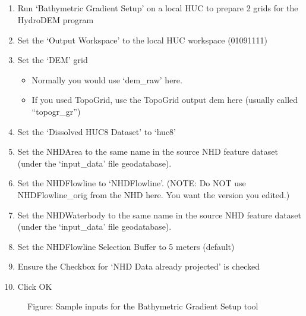 \documentclass[letterpaper,10pt,english]{sphinxmanual}
\begin{document}
\subparagraph{}
\label{\detokenize{ex_1:a-bathymetric-gradient-setup-from-arccat}}\begin{enumerate}
\def\theenumi{\arabic{enumi}}
\def\labelenumi{\theenumi .}
\makeatletter\def\p@enumii{\p@enumi \theenumi .}\makeatother
\item {} 
Run ‘Bathymetric Gradient Setup’ on a local HUC to prepare 2 grids for the HydroDEM program

\item {} 
Set the ‘Output Workspace’ to the local HUC workspace (01091111)

\item {} 
Set the ‘DEM’ grid
\begin{itemize}
\item {} 
Normally you would use ‘dem\_raw’ here.

\item {} 
If you used TopoGrid, use the TopoGrid output dem here (usually called “topogr\_gr”)

\end{itemize}

\item {} 
Set the ‘Dissolved HUC8 Dataset’ to ‘huc8’

\item {} 
Set the NHDArea to the same name in the source NHD feature dataset (under the ‘input\_data’ file geodatabase).

\item {} 
Set the NHDFlowline to ‘NHDFlowline’. (NOTE: Do NOT use NHDFlowline\_orig from the NHD here. You want the version you edited.)

\item {} 
Set the NHDWaterbody to the same name in the source NHD feature dataset (under the ‘input\_data’ file geodatabase).

\item {} 
Set the NHDFlowline Selection Buffer to 5 meters (default)

\item {} 
Ensure the Checkbox for ‘NHD Data already projected’ is checked

\item {} 
Click OK

\end{enumerate}


\begin{figure}[htbp]
\centering
\capstart

\noindent{}
\caption{Figure: Sample inputs for the Bathymetric Gradient Setup tool}\label{\detokenize{ex_1:id14}}\end{figure}
\end{document}
